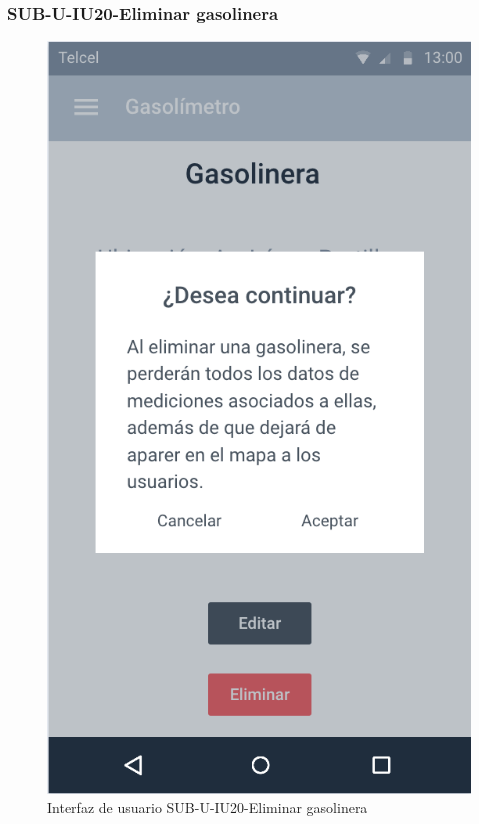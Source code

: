 \subsubsection{SUB-U-IU20-Eliminar gasolinera}\label{SUB-U-IU20}
\begin{figure}[H]
	\centering
	\includegraphics[scale=1]{Capitulo4/software/submodulos/usuarios/images/sub-u-iu20}
	\caption{Interfaz de usuario SUB-U-IU20-Eliminar gasolinera}
	\label{fig:sub-u-iu20}
\end{figure}